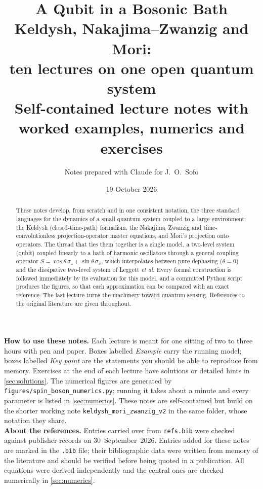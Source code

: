 \documentclass[11pt]{article}
\title{\textbf{A Qubit in a Bosonic Bath}\\[4pt]
\large Keldysh, Nakajima--Zwanzig and Mori:\\ ten lectures on one open quantum system\\[6pt]
\normalsize Self-contained lecture notes with worked examples, numerics and exercises}
\author{Notes prepared with Claude for J.~O.~Sofo}
\date{19 October 2026}
\numberwithin{equation}{section} %
\newcommand{\sx}{\sigma_x}
\newcommand{\sz}{\sigma_z}
\theoremstyle{definition}
\theoremstyle{plain}
\theoremstyle{remark}
\begin{document}
\maketitle

\begin{abstract}
\noindent These notes develop, from scratch and in one consistent notation, the three standard languages for the dynamics of a small quantum system coupled to a large environment: the Keldysh (closed-time-path) formalism, the Nakajima--Zwanzig and time-convolutionless projection-operator master equations, and Mori's projection onto operators.
The thread that ties them together is a single model, a two-level system (qubit) coupled linearly to a bath of harmonic oscillators through a general coupling operator $S=\cos\theta\,\sz+\sin\theta\,\sx$, which interpolates between pure dephasing ($\theta=0$) and the dissipative two-level system of Leggett \emph{et al.} Every formal construction is followed immediately by its evaluation for this model, and a committed Python script produces the figures, so that each approximation can be compared with an exact reference.
The last lecture turns the machinery toward quantum sensing.
References to the original literature are given throughout.
\end{abstract}

\begin{warnbox}
\small\textbf{How to use these notes.}
Each lecture is meant for one sitting of two to three hours with pen and paper.
Boxes labelled \emph{Example} carry the running model; boxes labelled \emph{Key point} are the statements you should be able to reproduce from memory.
Exercises at the end of each lecture have solutions or detailed hints in \cref{sec:solutions}.
The numerical figures are generated by \texttt{figures/spin\_boson\_numerics.py}; running it takes about a minute and every parameter is listed in \cref{sec:numerics}.
These notes are self-contained but build on the shorter working note \texttt{keldysh\_mori\_zwanzig\_v2} in the same folder, whose notation they share.\\[3pt]
\textbf{About the references.}
Entries carried over from \texttt{refs.bib} were checked against publisher records on 30~September~2026.
Entries added for these notes are marked in the \texttt{.bib} file; their bibliographic data were written from memory of the literature and should be verified before being quoted in a publication.
All equations were derived independently and the central ones are checked numerically in \cref{sec:numerics}.
\end{warnbox}

\tableofcontents
\clearpage

















\end{document}
